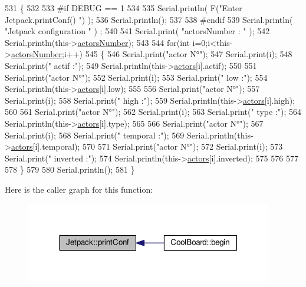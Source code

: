 \begin{DoxyCode}
531 \{
532 
533 \textcolor{preprocessor}{#if DEBUG == 1 }
534 
535     Serial.println( F(\textcolor{stringliteral}{"Enter Jetpack.printConf() "}) );
536     Serial.println();
537 
538 \textcolor{preprocessor}{#endif }
539     Serial.println( \textcolor{stringliteral}{"Jetpack configuration "} ) ;
540 
541     Serial.print( \textcolor{stringliteral}{"actorsNumber : "} );
542     Serial.println(this->\hyperlink{classJetpack_a52c86319cb3f7f1ab744a64db18a7ba5}{actorsNumber});
543  
544         \textcolor{keywordflow}{for}(\textcolor{keywordtype}{int} i=0;i<this->\hyperlink{classJetpack_a52c86319cb3f7f1ab744a64db18a7ba5}{actorsNumber};i++)
545     \{   
546         Serial.print(\textcolor{stringliteral}{"actor N°"});
547         Serial.print(i);
548         Serial.print(\textcolor{stringliteral}{" actif :"});
549         Serial.println(this->\hyperlink{classJetpack_a7e16d2f97837f9712a2e6de1c50d99db}{actors}[i].actif);
550 
551         Serial.print(\textcolor{stringliteral}{"actor N°"});
552         Serial.print(i);
553         Serial.print(\textcolor{stringliteral}{" low :"});
554         Serial.println(this->\hyperlink{classJetpack_a7e16d2f97837f9712a2e6de1c50d99db}{actors}[i].low);
555 
556         Serial.print(\textcolor{stringliteral}{"actor N°"});
557         Serial.print(i);
558         Serial.print(\textcolor{stringliteral}{" high :"});
559         Serial.println(this->\hyperlink{classJetpack_a7e16d2f97837f9712a2e6de1c50d99db}{actors}[i].high);
560 
561         Serial.print(\textcolor{stringliteral}{"actor N°"});
562         Serial.print(i);
563         Serial.print(\textcolor{stringliteral}{" type :"});
564         Serial.println(this->\hyperlink{classJetpack_a7e16d2f97837f9712a2e6de1c50d99db}{actors}[i].type);
565         
566         Serial.print(\textcolor{stringliteral}{"actor N°"});
567         Serial.print(i);
568         Serial.print(\textcolor{stringliteral}{" temporal :"});
569         Serial.println(this->\hyperlink{classJetpack_a7e16d2f97837f9712a2e6de1c50d99db}{actors}[i].temporal);
570 
571         Serial.print(\textcolor{stringliteral}{"actor N°"});
572         Serial.print(i);
573         Serial.print(\textcolor{stringliteral}{" inverted :"});
574         Serial.println(this->\hyperlink{classJetpack_a7e16d2f97837f9712a2e6de1c50d99db}{actors}[i].inverted);
575 
576  
577 
578     \}
579 
580     Serial.println();
581 \}
\end{DoxyCode}
Here is the caller graph for this function\+:\nopagebreak
\begin{figure}[H]
\begin{center}
\leavevmode
\includegraphics[width=305pt]{classJetpack_ac54a7bb4f9166bee32052253d9b1d306_icgraph}
\end{center}
\end{figure}
